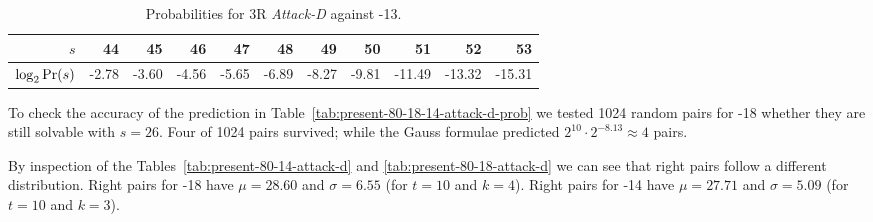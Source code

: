 \begin{table}[ht]
\begin{center}
\begin{tabular}{|r|r|r|r|r|r|r|r|r|r|r|}
\hline
$s$                         &   44 &    45 &    46 &    47 &    48 &    49 &    50 &     51 &     52 &     53\\
\hline
$\log_2 \textnormal{Pr}(s)$ & -2.78 & -3.60 & -4.56 & -5.65 & -6.89 & -8.27 & -9.81 & -11.49 & -13.32 & -15.31\\
\hline
\end{tabular}
\end{center}
\caption{Probabilities for 3R \emph{Attack-D} against -13.}
\label{tab:present-80-13-10-attack-d-prob}
\end{table}

To check the accuracy of the prediction in Table~\ref{tab:present-80-18-14-attack-d-prob} we tested 1024 random pairs for -18 whether they are still solvable with $s=26$. Four of 1024 pairs survived; while the Gauss formulae predicted $2^{10} \cdot 2^{-8.13} \approx 4$ pairs.

By inspection of the Tables~\ref{tab:present-80-14-attack-d} and \ref{tab:present-80-18-attack-d} we can see that right pairs follow a different distribution. Right pairs for -18 have $\mu = 28.60$ and $\sigma = 6.55$ (for $t=10$ and $k=4$). Right pairs for -14 have  $\mu = 27.71$ and $\sigma=5.09$ (for $t=10$ and $k=3$).

